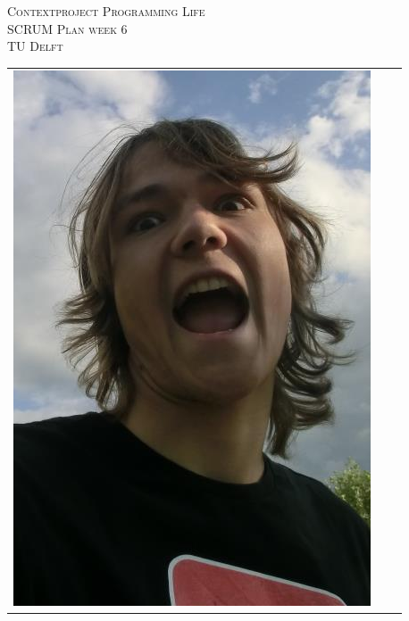 \begin{titlepage}
\begin{center}
\textsc{\LARGE Contextproject Programming Life}\\
\vspace{5pt}
\textsc{\LARGE SCRUM Plan week 6}\\
\vspace{5pt}
\textsc{\large TU Delft}

\begin{table}[ht]
\centering
\begin{tabular}{ccc}
\includegraphics[scale=0.2]{ruben.png}   &

\end{tabular}
\end{table}
\end{center}
\end{titlepage}
